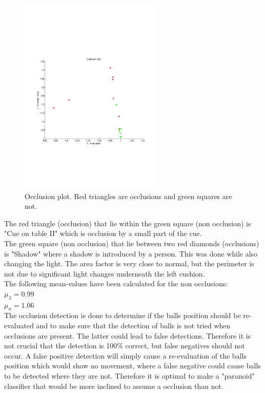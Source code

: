 \begin{figure}[H]
\begin{center}
\leavevmode
\includegraphics[width=0.6\textwidth]{images/occlusion_plot}
\end{center}
\caption{Occlusion plot. Red triangles are occlusions and green squares are not.}
\label{fig:occlusion_plot}
\end{figure}

The red triangle (occlusion) that lie within the green square (non occlusion) is "Cue on table II" which is occlusion by a small part of the cue.\\

The green square (non occlusion) that lie between two red diamonds (occlusions) is "Shadow" where a shadow is introduced by a person. This was done while also changing the light. The area factor is very close to normal, but the perimeter is not due to significant light changes underneath the left cushion.\\

The following mean-values have been calculated for the non occlusions:\\

$\mu_{\lambda} = 0.99$\\
$\mu_{\kappa} = 1.06$\\

The occlusion detection is done to determine if the balls position should be re-evaluated and to make sure that the detection of balls is not tried when occlusions are present. The latter could lead to false detections. Therefore it is not crucial that the detection is 100\% correct, but false negatives should not occur. A false positive detection will simply cause a re-evaluation of the balls position which would show no movement, where a false negative could cause balls to be detected where they are not. Therefore it is optimal to make a "paranoid" classifier that would be more inclined to assume a occlusion than not.\\

